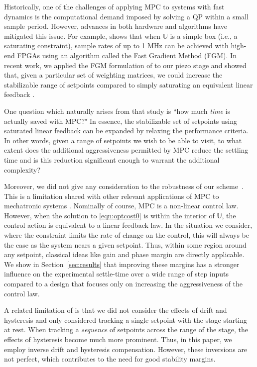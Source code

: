\documentclass[twocolumn,twoside]{IEEEtran}
\begin{document}
Historically, one of the challenges of applying MPC to systems with fast dynamics is the computational demand imposed by solving a QP within a small sample period. However, advances in both hardware and algorithms have mitigated this issue. For example, \cite{Jerez_Trans_2014} shows that when $\mathds{U}$ is a simple box (i.e., a saturating constraint), sample rates of up to 1 MHz can be achieved with high-end FPGAs using an algorithm called the Fast Gradient Method (FGM). In recent work, we applied the FGM formulation of \cite{Jerez_Trans_2014} to our piezo stage and showed that, given a particular set of weighting matrices, we could increase the stabilizable range of setpoints compared to simply saturating an equivalent linear feedback \cite{braker_application_2017}.

One question which naturally arises from that study is ``how much \emph{time} is actually saved with MPC?" In essence, the stabilizable set of setpoints using saturated linear feedback can be expanded by relaxing the performance criteria.
In other words, given a range of setpoints we wish to be able to visit, to what extent does the additional aggressiveness permitted by MPC reduce the settling time and is this reduction significant enough to warrant the additional complexity?

Moreover, we did not give any consideration to the robustness of our scheme~\cite{braker_application_2017}. This is a limitation shared with other relevant applications of MPC to mechatronic systems \cite{Wills_CDC_2005, Lin_ASME_2012, rana_design_2014}. Nominally of course, MPC is a non-linear control law. However, when the solution to \eqref{eqn:optcost0} is within the interior of $\mathds{U}$, the control action is equivalent to a linear feedback law. In the situation we consider, where the constraint limits the rate of change on the control, this will always be the case as the system nears a given setpoint. Thus, within some region around any setpoint, classical ideas like gain and phase margin are directly applicable. We show in Section~\ref{sec:results} that improving these margins has a stronger influence on the experimental settle-time over a wide range of step inputs compared to a design that focuses only on increasing the aggressiveness of the control law.

A related limitation of \cite{braker_application_2017} is that we did not consider the effects of drift and hysteresis and only considered tracking a single setpoint with the stage starting at rest. When tracking a \emph{sequence} of setpoints across the range of the stage, the effects of hysteresis become much more prominent. Thus, in this paper, we employ inverse drift and hysteresis compensation. However, these inversions are not perfect, which contributes to the need for good stability margins.
\end{document}
